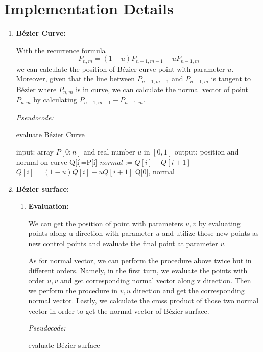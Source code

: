\documentclass[acmtog]{acmart}
\begin{document}
\section{Implementation Details}
\begin{enumerate}
	\setlength\parindent{2em}
	\item {\bf Bézier Curve:}
	\par With the recurrence formula
	\[P_{n,m} = (1-u)P_{n-1,m-1}+uP_{n-1,m}\]
	we can calculate the position of Bézier curve point with parameter $u$. Moreover, given that the line between $P_{n-1,m-1}$ and $P_{n-1,m}$ is tangent to Bézier where $P_{n,m}$ is in curve, we can calculate the normal vector of point $P_{n,m}$ by calculating $P_{n-1,m-1}-P_{n-1,m}$.
	\par {\it Pseudocode:}
	\begin{algorithm} 
		\caption{evaluate Bézier Curve} 
		\begin{algorithmic}
			\STATE input: array $P[0:n]$ and real number $u$ in $[0,1]$
			\STATE output: position and normal on curve
			\STATE Q[i]=P[i]
			\ENDFOR
						\STATE $normal:= Q[i]-Q[i+1]$ 
					\ENDIF
				\STATE $Q[i]=(1-u)Q[i]+uQ[i+1]$
				\ENDFOR
			\ENDFOR
			\RETURN Q[0], normal
		\end{algorithmic} 
	\end{algorithm}
	\item {\bf Bézier surface:}
	\begin{enumerate}
		\setlength\parindent{2em}
		\item {\bf Evaluation:}
		\par We can get the position of point with parameters $u,v$ by evaluating points along u direction with parameter $u$ and utilize those new points as new control points and evaluate the final point at parameter $v$.
		\par As for normal vector, we can perform the procedure above twice but in different orders. Namely, in the first turn, we evaluate the points with order $u,v$ and get corresponding normal vector along v direction. Then we perform the procedure in $v,u$ direction and get the corresponding normal vector. Lastly, we calculate the cross product of those two normal vector in order to get the normal vector of Bézier surface.  
		\par {\it Pseudocode:}
		\begin{algorithm} 
			\caption{evaluate Bézier surface} 
			\begin{algorithmic}

\end{algorithmic}
\end{algorithm}
\end{enumerate}
\end{enumerate}
\end{document}
